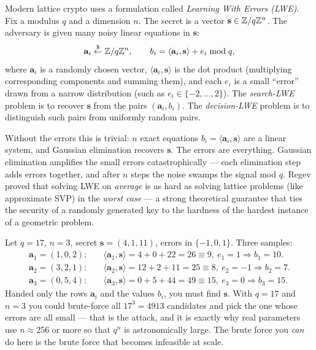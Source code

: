 Modern lattice crypto uses a formulation called \emph{Learning With Errors (LWE)}. Fix a modulus $q$ and a dimension $n$. The secret is a vector $\mathbf s \in \mathbb{Z}/q\mathbb{Z}^n$. The adversary is given many noisy linear equations in $\mathbf s$:
\[
  \mathbf a_i \stackrel{\$}{\gets} \mathbb{Z}/q\mathbb{Z}^n, \qquad b_i = \langle \mathbf a_i, \mathbf s\rangle + e_i \bmod q,
\]
where $\mathbf a_i$ is a randomly chosen vector, $\langle \mathbf a_i, \mathbf s\rangle$ is the dot product (multiplying corresponding components and summing them), and each $e_i$ is a small ``error'' drawn from a narrow distribution (such as $e_i \in \{-2,\dots,2\}$). The \emph{search-LWE} problem is to recover $\mathbf s$ from the pairs $(\mathbf a_i, b_i)$. The \emph{decision-LWE} problem is to distinguish such pairs from uniformly random pairs.

Without the errors this is trivial: $n$ exact equations $b_i=\langle \mathbf a_i,\mathbf s\rangle$ are a linear system, and Gaussian elimination recovers $\mathbf s$. The errors are everything. Gaussian elimination amplifies the small errors catastrophically --- each elimination step adds errors together, and after $n$ steps the noise swamps the signal mod $q$. Regev proved that solving LWE on \emph{average} is as hard as solving lattice problems (like approximate SVP) in the \emph{worst case} --- a strong theoretical guarantee that ties the security of a randomly generated key to the hardness of the hardest instance of a geometric problem.

\begin{example}
\label{ch35:ex-lwe}
Let $q=17$, $n=3$, secret $\mathbf s=(4,1,11)$, errors in $\{-1,0,1\}$. Three samples:
\[
\begin{aligned}
\mathbf a_1=(1,0,2): &\quad \langle\mathbf a_1,\mathbf s\rangle = 4+0+22=26\equiv 9,\ e_1=1 \Rightarrow b_1=10.\\
\mathbf a_2=(3,2,1): &\quad \langle\mathbf a_2,\mathbf s\rangle = 12+2+11=25\equiv 8,\ e_2=-1 \Rightarrow b_2=7.\\
\mathbf a_3=(0,5,4): &\quad \langle\mathbf a_3,\mathbf s\rangle = 0+5+44=49\equiv 15,\ e_3=0 \Rightarrow b_3=15.
\end{aligned}
\]
Handed only the rows $\mathbf a_i$ and the values $b_i$, you must find $\mathbf s$. With $q=17$ and $n=3$ you could brute-force all $17^3=4913$ candidates and pick the one whose errors are all small --- that is the attack, and it is exactly why real parameters use $n\approx 256$ or more so that $q^n$ is astronomically large. The brute force you \emph{can} do here is the brute force that becomes infeasible at scale.
\end{example}

